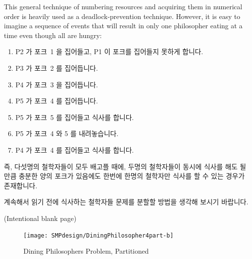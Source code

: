 This general technique of numbering resources and acquiring them in
numerical order is heavily used as a deadlock-prevention technique.
However, it is easy to imagine a sequence of events that will result
in only one philosopher eating at a time even though all are hungry:
\fi

\begin{enumerate}
    \item	P2 가 포크~1 을 집어들고, P1 이 포크를 집어들지 못하게 합니다.
    \item	P3 가 포크~2 를 집어듭니다.
    \item	P4 가 포크~3 을 집어듭니다.
    \item	P5 가 포크~4 를 집어듭니다.
    \item	P5 가 포크~5 를 집어들고 식사를 합니다.
    \item	P5 가 포크~4 와 5 를 내려놓습니다.
    \item	P4 가 포크~4 를 집어들고 식사를 합니다.

\end{enumerate}

즉, 다섯명의 철학자들이 모두 배고플 때에, 두명의 철학자들이 동시에 식사를
해도 될만큼 충분한 양의 포크가 있음에도 한번에 한명의 철학자만 식사를 할 수
있는 경우가 존재합니다.

계속해서 읽기 전에 식사하는 철학자들 문제를 분할할 방법을 생각해 보시기
바랍니다.

\pagebreak
(Intentional blank page)
\cleardoublepage

\begin{figure}[tb]
\centering
\texttt{[image: SMPdesign/DiningPhilosopher4part-b]}
\caption{Dining Philosophers Problem, Partitioned}
\end{figure}


